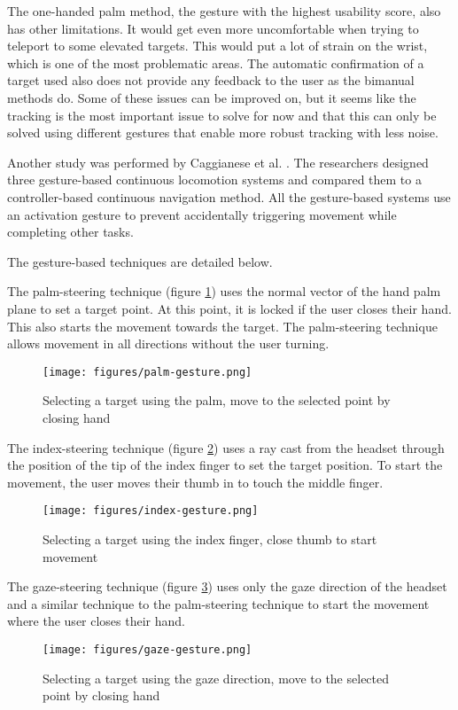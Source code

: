 The one-handed palm method, the gesture with the highest usability score, also has other limitations. It would get even more uncomfortable when trying to teleport to some elevated targets. This would put a lot of strain on the wrist, which is one of the most problematic areas. The automatic confirmation of a target used also does not provide any feedback to the user as the bimanual methods do. Some of these issues can be improved on, but it seems like the tracking is the most important issue to solve for now and that this can only be solved using different gestures that enable more robust tracking with less noise.



Another study was performed by Caggianese et al. \cite{Caggianese}. The researchers designed three gesture-based continuous locomotion systems and compared them to a controller-based continuous navigation method. All the gesture-based systems use an activation gesture to prevent accidentally triggering movement while completing other tasks.

The gesture-based techniques are detailed below.

The palm-steering technique (figure \ref{fig:palm}) uses the normal vector of the hand palm plane to set a target point. At this point, it is locked if the user closes their hand. This also starts the movement towards the target. The palm-steering technique allows movement in all directions without the user turning.
\begin{figure}[hbt!]
  \centering
  \texttt{[image: figures/palm-gesture.png]}
  \caption{Selecting a target using the palm, move to the selected point by closing hand}
  \label{fig:palm}
\end{figure}


The index-steering technique (figure \ref{fig:indexstear}) uses a ray cast from the headset through the position of the tip of the index finger to set the target position. To start the movement, the user moves their thumb in to touch the middle finger.

\begin{figure}[hbt!]
  \centering
  \texttt{[image: figures/index-gesture.png]}
  \caption{Selecting a target using the index finger, close thumb to start movement}
  \label{fig:indexstear}
\end{figure}


The gaze-steering technique (figure \ref{fig:gaze}) uses only the gaze direction of the headset and a similar technique to the palm-steering technique to start the movement where the user closes their hand.
\begin{figure}[hbt!]
  \centering
  \texttt{[image: figures/gaze-gesture.png]}
  \caption{Selecting a target using the gaze direction, move to the selected point by closing hand}
  \label{fig:gaze}
\end{figure}

